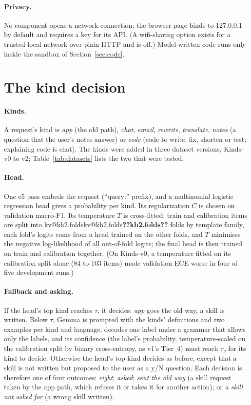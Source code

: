 \documentclass[11pt,a4paper]{article}
\makeatletter
\DeclareRobustCommand{\kv}[1]{\ifcsname kv@#1\endcsname\csname kv@#1\endcsname\else\textbf{??#1??}\fi}
\makeatother
\begin{document}
\paragraph{Privacy.} No component opens a network connection; the browser page binds to 127.0.0.1 by default and
requires a key for its API. (A wifi-sharing option exists for a trusted local network over plain HTTP and is off.)
Model-written code runs only inside the sandbox of Section~\ref{sec:code}.

\section{The kind decision}\label{sec:kinds}

\paragraph{Kinds.} A request's kind is \emph{app} (the old path), \emph{chat}, \emph{email}, \emph{rewrite},
\emph{translate}, \emph{notes} (a question that the user's notes answer) or \emph{code} (code to write, fix, shorten or
test; explaining code is chat). The kinds were added in three dataset versions, Kinds-v0 to v2; Table~\ref{tab:datasets} lists the two that were
tested.

\paragraph{Head.} One e5 pass embeds the request (``query:'' prefix), and a multinomial logistic regression head
gives a probability per kind. Its regularization $C$ is chosen on validation macro-F1. Its temperature $T$ is
cross-fitted: train and calibration items are split into \kv{kh2.folds} folds by template family, each fold's logits
come from a head trained on the other folds, and $T$ minimises the negative log-likelihood of all out-of-fold logits; the
final head is then trained on train and calibration together. (On Kinds-v0, a temperature fitted on its
calibration split alone (84 to 103 items) made validation ECE worse in four of five development runs.)

\paragraph{Fallback and asking.} If the head's top kind reaches $\tau$, it decides: \emph{app} goes the old way, a
skill is written. Below $\tau$, Gemma is prompted with the kinds' definitions and two examples per kind and language,
decodes one label under a grammar that allows only the labels, and its confidence (the label's probability,
temperature-scaled on the calibration split by binary cross-entropy, as v1's Tier~4) must reach $\tau_g$ for its kind
to decide. Otherwise the head's top kind decides as before, except that a skill is not written but proposed to the
user as a y/N question. Each decision is therefore one of four outcomes: \emph{right}; \emph{asked}; \emph{sent the old
way} (a skill request taken by the app path, which refuses it or takes it for another action); or \emph{a skill not asked for} (a wrong skill
written).
\end{document}
